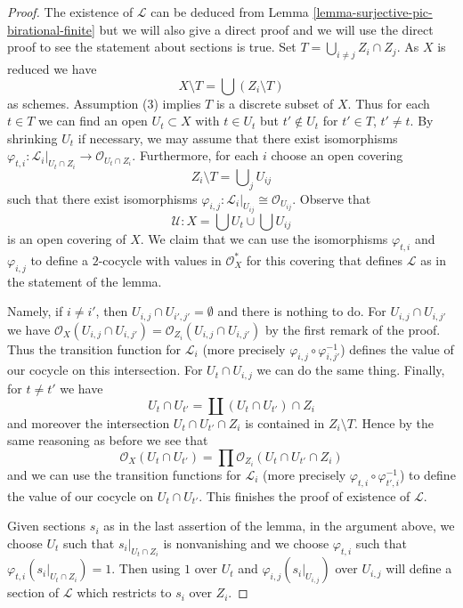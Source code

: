 \documentclass[10pt,a4paper]{amsart}
\theoremstyle{plain}
\theoremstyle{definition}
\theoremstyle{remark}
\numberwithin{equation}{subsection}
\begin{document}
\begin{proof}
The existence of $\mathcal{L}$ can be deduced from
Lemma \ref{lemma-surjective-pic-birational-finite}
but we will also give a direct proof and we will use
the direct proof to see the statement about sections is true.
Set $T = \bigcup_{i \not = j} Z_i \cap Z_j$. As $X$ is reduced we have
$$
X \setminus T = \bigcup (Z_i \setminus T)
$$
as schemes. Assumption (3) implies $T$ is a discrete subset of $X$.
Thus for each $t \in T$ we can find an open $U_t \subset X$
with $t \in U_t$ but $t' \not \in U_t$ for $t' \in T$, $t' \not = t$.
By shrinking $U_t$ if necessary, we may assume that there exist isomorphisms
$\varphi_{t, i} : \mathcal{L}_i|_{U_t \cap Z_i} \to
\mathcal{O}_{U_t \cap Z_i}$. Furthermore, for each $i$ choose an open covering
$$
Z_i \setminus T = \bigcup\nolimits_j U_{ij}
$$
such that there exist isomorphisms
$\varphi_{i, j} : \mathcal{L}_i|_{U_{ij}} \cong \mathcal{O}_{U_{ij}}$.
Observe that
$$
\mathcal{U} : X = \bigcup U_t \cup \bigcup U_{ij}
$$
is an open covering of $X$. We claim that we can use the isomorphisms
$\varphi_{t, i}$ and $\varphi_{i, j}$ to define a $2$-cocycle with values
in $\mathcal{O}_X^*$ for this covering that defines $\mathcal{L}$ as
in the statement of the lemma.

\medskip\noindent
Namely, if $i \not = i'$, then $U_{i, j} \cap U_{i', j'} = \emptyset$
and there is nothing to do. For $U_{i, j} \cap U_{i, j'}$ we have
$\mathcal{O}_X(U_{i, j} \cap U_{i, j'}) =
\mathcal{O}_{Z_i}(U_{i, j} \cap U_{i, j'})$ by the first remark of the proof.
Thus the transition function for $\mathcal{L}_i$ (more precisely
$\varphi_{i, j} \circ \varphi_{i, j'}^{-1}$) defines the value of our
cocycle on this intersection.
For $U_t \cap U_{i, j}$ we can do the same thing.
Finally, for $t \not = t'$ we have
$$
U_t \cap U_{t'} = \coprod (U_t \cap U_{t'}) \cap Z_i
$$
and moreover the intersection $U_t \cap U_{t'} \cap Z_i$ is contained
in $Z_i \setminus T$. Hence by the same reasoning as before we see that
$$
\mathcal{O}_X(U_t \cap U_{t'}) =
\prod \mathcal{O}_{Z_i}(U_t \cap U_{t'} \cap Z_i)
$$
and we can use the transition functions for $\mathcal{L}_i$ (more precisely
$\varphi_{t, i} \circ \varphi_{t', i}^{-1}$) to define the value of
our cocycle on $U_t \cap U_{t'}$. This finishes the proof of existence
of $\mathcal{L}$.

\medskip\noindent
Given sections $s_i$ as in the last assertion of the lemma, in the argument
above, we choose $U_t$ such that $s_i|_{U_t \cap Z_i}$ is nonvanishing and
we choose $\varphi_{t, i}$ such that $\varphi_{t, i}(s_i|_{U_t \cap Z_i}) = 1$.
Then using $1$ over $U_t$ and $\varphi_{i, j}(s_i|_{U_{i, j}})$ over
$U_{i, j}$ will define a section of $\mathcal{L}$ which restricts
to $s_i$ over $Z_i$.
\end{proof}
\end{document}
